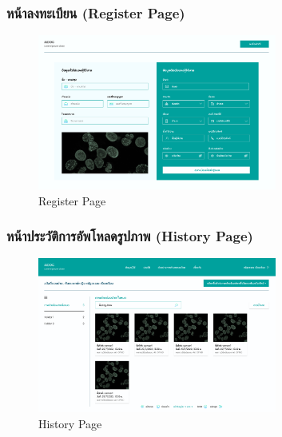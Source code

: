 \subsubsection{หน้าลงทะเบียน (Register Page)}
\begin{figure}[h]
    \begin{center}
        \includegraphics[width=0.7\textwidth]{img/user/2-register-page.png}
    \end{center}
    \caption[Poem]{Register Page}
    \label{fig:register}
\end{figure}

\subsubsection{หน้าประวัติการอัพโหลดรูปภาพ (History Page)}
\begin{figure}[h]
    \begin{center}
        \includegraphics[width=0.7\textwidth]{img/user/3-1-histort-page.png}
    \end{center}
    \caption[Poem]{History Page}
    \label{fig:history}
\end{figure}

